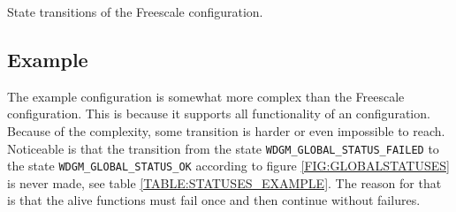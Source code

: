 \begin{table}[!ht]
  \caption{State transitions of the Freescale configuration.}
  \label{TABLE:STATUSES_FREESCALE}
  
\end{table}

\subsection{Example}
The example configuration is somewhat more complex than the Freescale
configuration. This is because it supports all functionality of an
configuration. Because of the complexity, some transition is harder or
even impossible to reach. Noticeable is that the transition from the
state \lstinline!WDGM_GLOBAL_STATUS_FAILED! to the state
\lstinline!WDGM_GLOBAL_STATUS_OK! according to figure
\ref{FIG:GLOBALSTATUSES} is never made, see table
\ref{TABLE:STATUSES_EXAMPLE}. The reason for that is that the alive
functions must fail once and then continue without failures.
